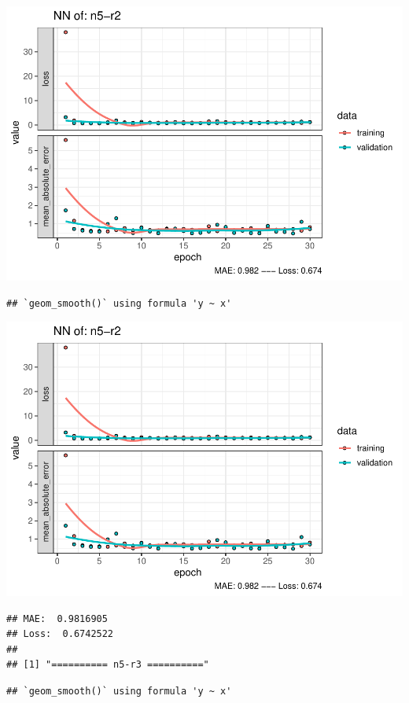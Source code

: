 \documentclass[
]{article}
\begin{document}
\includegraphics{project-code_files/figure-latex/unnamed-chunk-18-37.pdf}

\begin{verbatim}
## `geom_smooth()` using formula 'y ~ x'
\end{verbatim}

\includegraphics{project-code_files/figure-latex/unnamed-chunk-18-38.pdf}

\begin{verbatim}
## MAE:  0.9816905
## Loss:  0.6742522 
## 
## [1] "========== n5-r3 =========="
\end{verbatim}

\begin{verbatim}
## `geom_smooth()` using formula 'y ~ x'
\end{verbatim}
\end{document}
